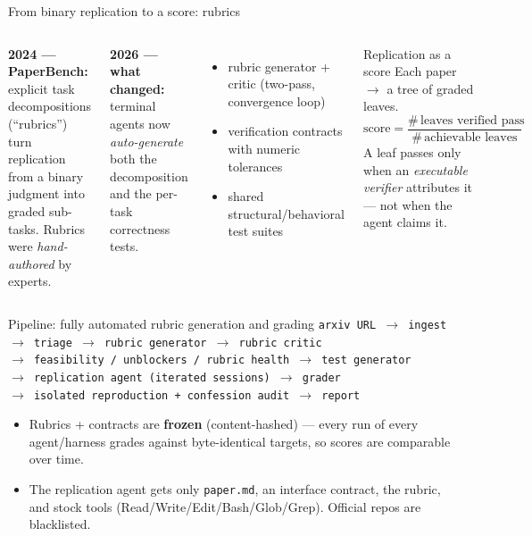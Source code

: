 \documentclass[aspectratio=169]{beamer}
\begin{document}
\begin{frame}{From binary replication to a score: rubrics}
  \begin{columns}[T]
      \textbf{2024 --- PaperBench:} explicit task decompositions (``rubrics'')
      turn replication from a binary judgment into graded sub-tasks.
      Rubrics were \emph{hand-authored} by experts.
      \vspace{0.5em}

      \textbf{2026 --- what changed:} terminal agents now \emph{auto-generate}
      both the decomposition and the per-task correctness tests.
      \begin{itemize}
        \item rubric generator + critic (two-pass, convergence loop)
        \item verification contracts with numeric tolerances
        \item shared structural/behavioral test suites
      \end{itemize}
      \begin{block}{Replication as a score}
        Each paper $\rightarrow$ a tree of graded leaves.
        \[
          \text{score} = \frac{\#\,\text{leaves verified pass}}{\#\,\text{achievable leaves}}
        \]
        A leaf passes only when an \emph{executable verifier} attributes it ---
        not when the agent claims it.
      \end{block}
  \end{columns}
\end{frame}

\begin{frame}{Pipeline: fully automated rubric generation and grading}
  \centering
  \small
  \texttt{arxiv URL $\rightarrow$ ingest $\rightarrow$ triage $\rightarrow$ rubric generator $\rightarrow$ rubric critic}\\[2pt]
  \texttt{$\rightarrow$ feasibility / unblockers / rubric health $\rightarrow$ test generator}\\[2pt]
  \texttt{$\rightarrow$ replication agent (iterated sessions) $\rightarrow$ grader}\\[2pt]
  \texttt{$\rightarrow$ isolated reproduction + confession audit $\rightarrow$ report}
  \vspace{1em}
  \begin{itemize}
    \item Rubrics + contracts are \textbf{frozen} (content-hashed) --- every run of every
          agent/harness grades against byte-identical targets, so scores are comparable over time.
    \item The replication agent gets only \texttt{paper.md}, an interface contract, the
          rubric, and stock tools (Read/Write/Edit/Bash/Glob/Grep). Official repos are blacklisted.
  \end{itemize}
\end{frame}
\end{document}
